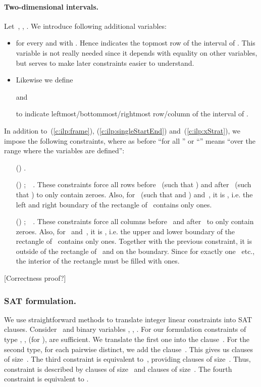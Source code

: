 \documentclass[runningheads]{llncs}
\newcounter{constr}
\newcommand{\constr}[1]{\noindent \refstepcounter{constr}\theconstr #1}
\begin{document}
\paragraph*{Two-dimensional intervals.}
Let~, , .
We introduce following additional variables:
\begin{itemize}
\item  for every  and 	
	with .  Hence
	 indicates the topmost row of the interval
	of .  This variable is not really needed since it 
	depends with equality on other variables,
	but serves to make later constraints easier to understand.
\item Likewise we define
	
	 and
	
	to indicate leftmost/bottommost/rightmost row/column of the interval
	of .
\end{itemize}
In addition to~(\ref{c:ilp:frame}), (\ref{c:ilp:singleStartEnd})
and~(\ref{c:ilp:xStrat}),
we impose the following constraints, where as before ``for all ''
or ``'' means ``over the range where the variables are defined'':
\begin{itemize}
\item[(\constr{\label{c:ilp:2dim:xEnd}})] 
	 .
\item[(\constr{\label{c:ilp:2dim:rows}})] 
	 ;~~.
These constraints force all rows before~ 
(such that )
and after~ 
(such that )
to only contain zeroes.
Also, for~ 
(such that  and )
and~,
it is , i.e. the left and right boundary of the rectangle of~
contains only ones.
\item[(\constr{\label{c:ilp:2dim:cols}})] 
	 ;~~.
These constraints force all columns before~ 
and after~ to only contain zeroes.
Also, for~ 
and~,
it is , i.e. the upper and lower boundary of the rectangle of~
contains only ones.
Together with the previous constraint, it is~ outside of the rectangle of~
and  on the boundary.
Since  for exactly one~ etc.,
the interior of the rectangle must be filled with ones.
\end{itemize}
[Correctness proof?]
\subsubsection{SAT formulation.}
\label{se:1dim:sat}



We use straightforward methods to translate 
integer linear constraints into SAT clauses.
Consider~ and binary variables 
, , .
For our formulation constraints 
of type
, 
, 
 (for ),
 are sufficient.
We translate the first one
into the clause~.
For the second type, for each  pairwise distinct,
we add the clause~. 
This gives us  clauses of size~.
The third constraint is equivalent to~,
providing  clauses of size~.
Thus, constraint 
is described by  clauses of size~
and  clauses of size~. 
The fourth constraint is equivalent to .
\fi
\end{document}
